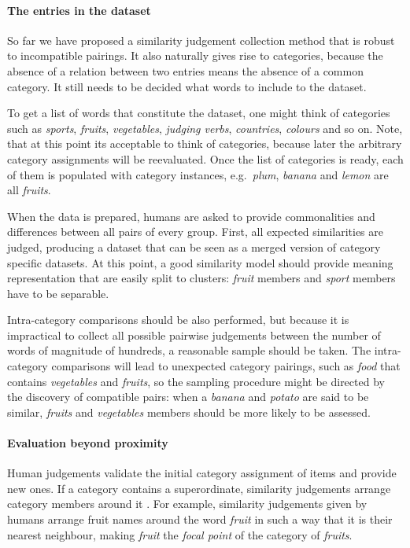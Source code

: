 \documentclass[11pt]{article}
\begin{document}
\paragraph{The entries in the dataset}

So far we have proposed a similarity judgement collection method that is robust to incompatible pairings. It also naturally gives rise to categories, because the absence of a relation between two entries means the absence of a common category. It still needs to be decided what words to include to the dataset.

To get a list of words that constitute the dataset, one might think of categories such as \textit{sports}, \textit{fruits}, \textit{vegetables}, \textit{judging verbs}, \textit{countries}, \textit{colours} and so on. Note, that at this point its acceptable to think of categories, because later the arbitrary category assignments will be reevaluated. Once the list of categories is ready, each of them is populated with category instances, e.g.~\textit{plum}, \textit{banana} and \textit{lemon} are all \textit{fruits}.

When the data is prepared, humans are asked to provide commonalities and differences between all pairs of every group. First, all expected similarities are judged, producing a dataset that can be seen as a merged version of category specific datasets. At this point, a good similarity model should provide meaning representation that are easily split to clusters: \textit{fruit} members and \textit{sport} members have to be separable.

Intra-category comparisons should be also performed, but because it is impractical to collect all possible pairwise judgements between the number of words of magnitude of hundreds, a reasonable sample should be taken. The intra-category comparisons will lead to unexpected category pairings, such as \textit{food} that contains \textit{vegetables} and \textit{fruits}, so the sampling procedure might be directed by the discovery of compatible pairs: when a \textit{banana} and \textit{potato} are said to be similar, \textit{fruits} and \textit{vegetables} members should be more likely to be assessed.

\paragraph{Evaluation beyond proximity}

Human judgements validate the initial category assignment of items and provide new ones. If a category contains a superordinate, similarity judgements arrange category members around it \cite{1986-13502-00119860101}. For example, similarity judgements given by humans arrange fruit names around the word \textit{fruit} in such a way that it is their nearest neighbour, making \textit{fruit} the \emph{focal point} of the category of \textit{fruits}.
\end{document}
